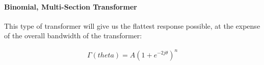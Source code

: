 \documentclass[colorlinks,11pt,a4paper,normalphoto,withhyper,ragged2e]{altareport}
\begin{document}
\paragraph{Binomial, Multi-Section Transformer} \vspace{5mm}

This type of transformer will give us the flattest response possible, at the expense of the overall bandwidth of the transformer: \linebreak

\begin{gather*}
	\Gamma(theta) = A (1 + e^{-2j\theta})^n
\end{gather*}











\newpage
{}  %


\end{document}
